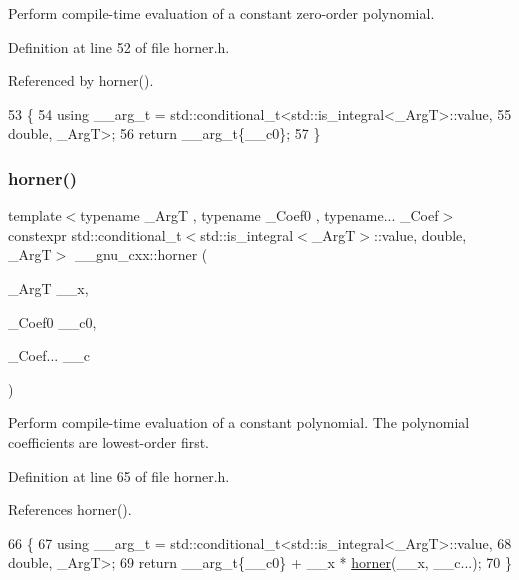 Perform compile-\/time evaluation of a constant zero-\/order polynomial. 

Definition at line 52 of file horner.\+h.



Referenced by horner().


\begin{DoxyCode}
53   \{
54     \textcolor{keyword}{using} \_\_arg\_t = std::conditional\_t<std::is\_integral<\_ArgT>::value,
55                                         double, \_ArgT>;
56     \textcolor{keywordflow}{return} \_\_arg\_t\{\_\_c0\};
57   \}
\end{DoxyCode}
\mbox{\label{namespace____gnu__cxx_a027e4b11b3b25078522220207c2d7f36}} 
\subsubsection{\texorpdfstring{horner()}{horner()}\hspace{0.1cm}{\footnotesize\ttfamily [2/2]}}
{\footnotesize\ttfamily template$<$typename \+\_\+\+ArgT , typename \+\_\+\+Coef0 , typename... \+\_\+\+Coef$>$ \\
constexpr std\+::conditional\+\_\+t$<$std\+::is\+\_\+integral$<$\+\_\+\+ArgT$>$\+::value, double, \+\_\+\+ArgT$>$ \+\_\+\+\_\+gnu\+\_\+cxx\+::horner (\begin{DoxyParamCaption}\item[{\+\_\+\+ArgT}]{\+\_\+\+\_\+x,  }\item[{\+\_\+\+Coef0}]{\+\_\+\+\_\+c0,  }\item[{\+\_\+\+Coef...}]{\+\_\+\+\_\+c }\end{DoxyParamCaption})}

Perform compile-\/time evaluation of a constant polynomial. The polynomial coefficients are lowest-\/order first. 

Definition at line 65 of file horner.\+h.



References horner().


\begin{DoxyCode}
66   \{
67     \textcolor{keyword}{using} \_\_arg\_t = std::conditional\_t<std::is\_integral<\_ArgT>::value,
68                                         double, \_ArgT>;
69     \textcolor{keywordflow}{return} \_\_arg\_t\{\_\_c0\} + \_\_x * \hyperlink{namespace____gnu__cxx_a027e4b11b3b25078522220207c2d7f36}{horner}(\_\_x, \_\_c...);
70   \}
\end{DoxyCode}
\mbox{\label{namespace____gnu__cxx_af87123557fba351af5069ed8d1b99ec1}} 
